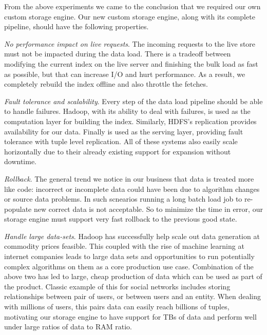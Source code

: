 From the above experiments we came to the conclusion that we required
our own custom storage engine. Our new custom storage engine, along
with its complete pipeline, should have the following properties. 
\begin{compactitem}
\item \emph{No performance impact on live requests}. The incoming
requests to the live store must not be impacted during the data load.
There is a tradeoff between modifying the current index on the live
server and finishing the bulk load as fast as possible, but that can
increase I/O and hurt performance. As a result, we completely rebuild
the index offline and also throttle the fetches. 
\item \emph{Fault tolerance and scalability}. Every step of the data
load pipeline should be able to handle failures. Hadoop, with its
ability to deal with failures, is used as the computation layer for
building the index. Similarly, HDFS's replication provides
availability for our data. Finally \projectname{} is used as the 
serving layer, providing fault tolerance with tuple level replication. 
All of these systems also easily scale horizontally due to
their already existing support for expansion without downtime. 
\item \emph{Rollback}. The general trend we notice in our business
that data is treated more like code: incorrect or incomplete data
could have been due to algorithm changes or source data problems. 
In such scnearios running a long batch load job to re-populate new
correct data is not acceptable. So to minimize the time in error, 
our storage engine must support very fast rollback to the previous 
good state.
\item \emph{Handle large data-sets}. Hadoop has successfully help
scale out data generation at commodity prices feasible.
This coupled with the rise of machine learning at internet companies 
leads to large data sets and opportunities to run potentially complex 
algorithms on them as a core production use case. Combination of 
the above two has led to large, cheap production of data which can 
be used as part of the product. Classic example of this for social 
networks includes storing relationships between pair of users,
or between users and an entity. When dealing with millions of users, 
this pairs data can easily reach billions of tuples, motivating
our storage engine to have support for TBs of data and perform 
well under large ratios of data to RAM ratio.
\end{compactitem}

